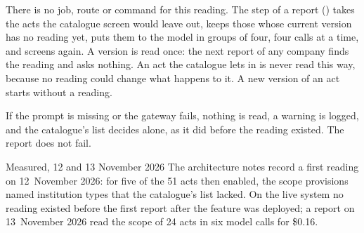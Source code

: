 There is no job, route or command for this reading. The step  of a
report () takes the acts the catalogue screen would leave out,
keeps those whose current version has no reading yet, puts them to the model in groups of
four, four calls at a time, and screens again. A version is read once: the next report of
any company finds the reading and asks nothing. An act the catalogue lets in is never read
this way, because no reading could change what happens to it. A new version of an act starts
without a reading.

If the prompt is missing or the gateway fails, nothing is read, a warning is logged, and the
catalogue's list decides alone, as it did before the reading existed. The report does not
fail.

\begin{lessonbox}{Measured, 12 and 13 November 2026}
The architecture notes record a first reading on 12~November 2026: for five of the 51 acts
then enabled, the scope provisions named institution types that the catalogue's list lacked.
On the live system no
reading existed before the first report after the feature was deployed; a report on
13~November 2026 read the scope of 24 acts in six model calls for \$0.16.
\end{lessonbox}

